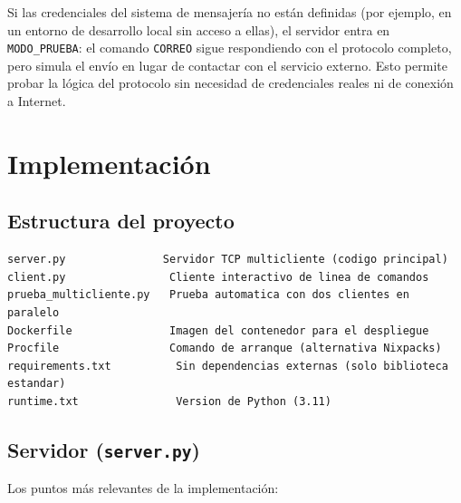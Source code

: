 \documentclass[12pt,a4paper]{article}
\begin{document}
Si las credenciales del sistema de mensajería no están definidas (por ejemplo, en un entorno de desarrollo local sin acceso a ellas), el servidor entra en \texttt{MODO\_PRUEBA}: el comando \texttt{CORREO} sigue respondiendo con el protocolo completo, pero simula el envío en lugar de contactar con el servicio externo. Esto permite probar la lógica del protocolo sin necesidad de credenciales reales ni de conexión a Internet.


\section{Implementación}

\subsection{Estructura del proyecto}

\begin{verbatim}
server.py               Servidor TCP multicliente (codigo principal)
client.py                Cliente interactivo de linea de comandos
prueba_multicliente.py   Prueba automatica con dos clientes en paralelo
Dockerfile               Imagen del contenedor para el despliegue
Procfile                 Comando de arranque (alternativa Nixpacks)
requirements.txt          Sin dependencias externas (solo biblioteca estandar)
runtime.txt               Version de Python (3.11)
\end{verbatim}

\subsection{Servidor (\texttt{server.py})}



Los puntos más relevantes de la implementación:
\end{document}
